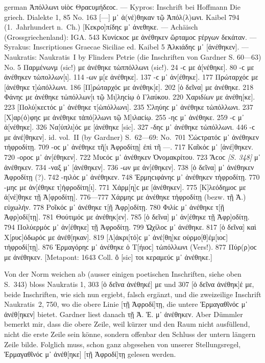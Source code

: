 \begin{otherlanguage*}{german}
Ἀπόλλωνι υἱὸϲ Θραϲυμήδεοϲ. — Kypros: Inschrift bei Hoffmann Die griech. Dialekte 1, 85 No. 163 [—] μ᾽ ἀ(νέ)θηκαν τῷ Ἀπόλ(λ)ωνι. Kaibel 794 (1.~Jahrhundert n.~Ch.) [Κεκρο]πíδηϲ μ᾽ ἀνεθηκε. — Achäisch (Grossgriechenland): IGA. 543 Κυνίϲκοϲ με ἀνέθηκεν ὥρταμοϲ ϝέργων δεκάταν. — Syrakus: Inscriptiones Graecae Siciliae ed. Kaibel 5 Ἀλκιάδηϲ μ᾽ [ἀνέθηκεν]. — Naukratis: Naukratis~I by Flinders Petrie (die Inschriften von Gardner S. 60—63) No. 5 Παρμένωνμ (sic!) με ἀνέθηκε τὠππόλλωνι (sic!). 24 -ϲ με ἀ[νέθηκε]. 80 -ϲ με ἀνέθηκεν τὠπολλων[ι]. 114 -ων μ[ε ἀνέθηκε]. 137 -ϲ μ᾽ ἀν[έθηκε]. 177 Πρώταρχόϲ με [ἀνέθηκε τ]ὠπόλλωνι. 186 [Π]ρώταρχόϲ με ἀνέθηκ[ε]. 202 [ὁ δεῖνα] με ἀνέθηκε. 218 Φάνηϲ με ἀνέθηκε τὠπόλλων[ι τῷ Μι]ληϲίῳ ὁ Γλαύκου. 220 Χαριδíων με ἀνέθη[κε]. 223 [Πολύ]κεϲτόϲ μ᾽ ἀνέθηκε τ[ὠπόλλωνι]. 235 Σληύηϲ μ᾽ ἀνέθηκε τὠπόλλωνι. 237 [Χ]αρ(ό)φηϲ με ἀνέθηκε τἀπό[λλωνι τῷ Μ]ιλαϲίῳ. 255 -ηϲ μ᾽ ἀνέθηκε. 259 -ϲ μ᾽ ἀ[νέθηκε]. 326 Να[ύπλι]όϲ με [ἀνέθηκε [sic]. 327 -δηϲ μ᾽ ἀνέθηκε τὠπόλλωνι. 446 -ϲ με ἀνέ[θηκεν]. id. vol.~II (by Gardner) S.~62—69: No.~701 Σώϲτρατόϲ μ᾽ ἀνέθηκεν τἠφροδίτῃ. 709 -οϲ μ᾽ ἀνέθηκε τῆ[ι Ἀφροδίτῃ] ἐπὶ τῆ —. 717 Καῖκόϲ μ᾽ [ἀνέ]θηκεν. 720 -οροϲ μ᾽ ἀν[έθηκεν]. 722 Μυϲόϲ μ᾽ ἀνέθηκεν Ὀνομακρίτου. 723 Ἄϲοϲ \hypertarget{p348}{\emph{[S. 348]}}\label{p348} μ᾽ ἀνέθηκεν. 734 -ναξ μ᾽ [ἀνέθηκεν]. 736 -ων με ἀν[έθηκεν]. 738 [ὁ δεῖνα] μ᾽ ἀνέθηκεν Ἀφροδίτῃ (?). 742 -ηιλόϲ μ᾽ ἀνέθηκεν. 748 Ἑρμηϲιφάνηϲ μ᾽ ἀνέθηκεν τἠφροδίτῃ. 770 -μηϲ με ἀν[έθηκε τ]ἠφροδίτη[ι]. 771 Χάρμ[η]ϲ με [ἀνέθηκεν]. 775 [Κ]λεόδημοϲ με ἀ[νέ]θηκε τῇ Ἀ[φροδίτῃ]. 776—777 Χάρμηϲ με ἀνέθηκε τἠφροδίτῃ (bezw. τῇ Ἀ.) εὐχωλήν. 778 Ροῖκόϲ μ᾽ ἀνέθηκε τ[ῇ Ἀφρ]οδίτῃ. 780 Φιλίϲ μ᾽ ἀνέθηκε τ[ῇ Ἀφρ]οδί[τῃ]. 781 Θούτιμόϲ με ἀνέθηκ[εν]. 785 [ὁ δεῖνα] μ᾽ ἀν[έθηκε τῇ Ἀφρ]οδίτῃ. 794 Πολύερμόϲ μ᾽ ἀν[έθηκε] τῇ Ἀφροδίτῃ. 799 Ὠχίλοϲ μ᾽ ἀνέθηκε. 817 [ὁ δεῖνα] καὶ Χ[ρυϲ]όδωρόϲ με ἀνέθ[ηκαν]. 819 [Λ]άκρι[τό]ϲ μ᾽ ἀνέ[θη]κε οὑρμο[θ]έμ[ιοϲ] τἠφροδί[τῃ]. 876 Ἑρμαγόρηϲ μ᾽ ἀνέ\-θηκε ὁ Τ[ήιοϲ] τὠπόλλωνι (Vers!). 877 Πύρ(ρ)οϲ με ἀνέθηκεν. [Metapont: 1643 Coll. ὄ [sic]
τοι κεραμεύϲ μ᾽ ἀνέθηκε.]

Von der Norm weichen ab (ausser einigen poetischen Inschriften, siehe oben S.~343) bloss Naukratis 1, 303 [ὁ δεῖνα ἀνέθηκέ] με und 307 [ὁ δεῖνα ἀνέθηκ]έ με, beide Inschriften, wie sich nun ergiebt, falsch ergänzt, und die zweizeilige Inschrift Naukratis~2, 750, wo die obere Linie [τῇ Ἀφροδί]τῃ, die untere Ἑρμαγα\-θῖνόϲ μ᾽ ἀνέθ[ηκεν] bietet. Gardner liest danach τῇ Ἀ. Ἑ. μ᾽ ἀνέθηκεν. Aber Dümmler bemerkt mir, dass die obere Zeile, weil kürzer und den Raum nicht ausfüllend, nicht die erste Zeile sein könne, sondern offenbar den Schluss der untern längern Zeile bilde. Folglich muss, schon ganz abgesehen von unserer Stellungsregel, Ἑρμαγαθῖνόϲ μ᾽ ἀνέθ[ηκε] [τῇ Ἀφροδί]τῃ gelesen werden.


\end{otherlanguage*}
